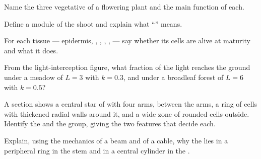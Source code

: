 \begin{exercise}[$\star$]\label{exo:b1:flowering-plant-organization:1}
Name the three vegetative  of a flowering plant and the main
function of each.
\end{exercise}

\begin{exercise}[$\star$]\label{exo:b1:flowering-plant-organization:2}
Define a module of the shoot and explain what ``''
means.
\end{exercise}

\begin{exercise}[$\star$]\label{exo:b1:flowering-plant-organization:3}
For each tissue --- epidermis, , , ,
,  --- say whether its cells are alive at maturity and what
it does.
\end{exercise}

\begin{exercise}[$\star$]\label{exo:b1:flowering-plant-organization:4}
From the light-interception figure, what fraction of the light reaches
the ground under a meadow of $L = 3$ with $k = 0.3$, and under a
broadleaf forest of $L = 6$ with $k = 0.5$?
\end{exercise}

\begin{exercise}[$\star\star$]\label{exo:b1:flowering-plant-organization:5}
A section shows a central star of  with four arms, 
between the arms, a ring of cells with thickened radial walls around
it, and a wide zone of rounded cells outside. Identify the  and
the group, giving the two features that decide each.
\end{exercise}

\begin{exercise}[$\star\star$]\label{exo:b1:flowering-plant-organization:6}
Explain, using the mechanics of a beam and of a cable, why the
 lies in a peripheral ring in the stem and in a central
cylinder in the .
\end{exercise}


